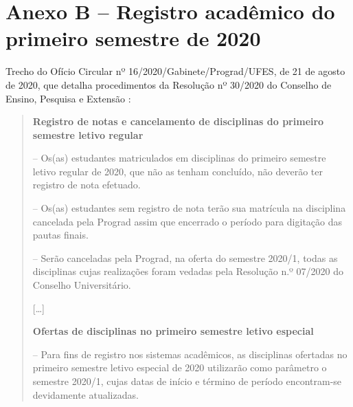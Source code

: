 \documentclass[12pt,a4paper]{article}
\begin{document}
\section*{Anexo B -- Registro acadêmico do primeiro semestre de 2020}

Trecho do Ofício Circular nº 16/2020/Gabinete/Prograd/UFES, de 21 de agosto de
2020, que detalha procedimentos da Resolução nº 30/2020 do Conselho de Ensino,
Pesquisa e Extensão \citep{ufes2020oficio16}:

\begin{quote}
\textbf{Registro de notas e cancelamento de disciplinas do primeiro semestre
letivo regular}

-- Os(as) estudantes matriculados em disciplinas do primeiro semestre letivo
regular de 2020, que não as tenham concluído, não deverão ter registro de nota
efetuado.

-- Os(as) estudantes sem registro de nota terão sua matrícula na disciplina
cancelada pela Prograd assim que encerrado o período para digitação das pautas
finais.

-- Serão canceladas pela Prograd, na oferta do semestre 2020/1, todas as
disciplinas cujas realizações foram vedadas pela Resolução n.º 07/2020 do
Conselho Universitário.

[\ldots]

\textbf{Ofertas de disciplinas no primeiro semestre letivo especial}

-- Para fins de registro nos sistemas acadêmicos, as disciplinas ofertadas no
primeiro semestre letivo especial de 2020 utilizarão como parâmetro o semestre
2020/1, cujas datas de início e término de período encontram-se devidamente
atualizadas.
\end{quote}
\end{document}

